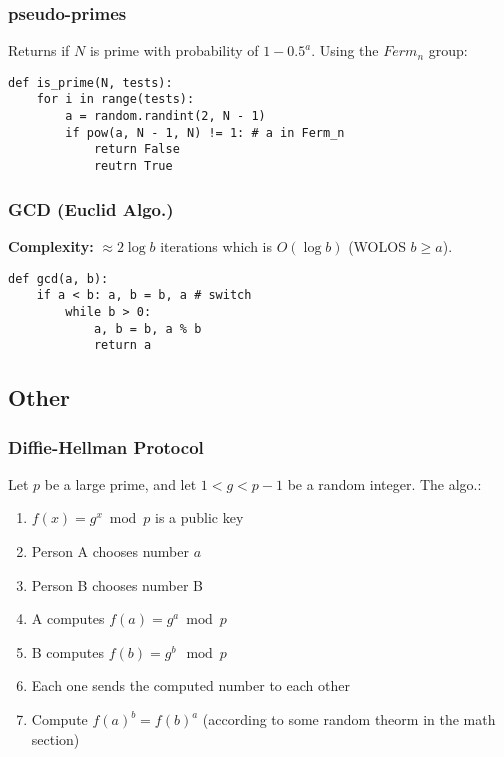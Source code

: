\documentclass[]{article}
\begin{document}
\begin{multicols}{2}
		\subsubsection{pseudo-primes}
		Returns if $ N $ is prime with probability of $ 1 - 0.5^{a} $. 
		Using the $ Ferm_n $ group: 
		\begin{lstlisting}
def is_prime(N, tests): 
	for i in range(tests): 
		a = random.randint(2, N - 1)
		if pow(a, N - 1, N) != 1: # a in Ferm_n
			return False
			reutrn True\end{lstlisting}
		\subsubsection{GCD (Euclid Algo.)}
		\textbf{Complexity: }$ \approx 2 \log b $ iterations which is $ O(\log b) $ (WOLOS $ b \ge a $). 
		\begin{lstlisting}
def gcd(a, b): 
	if a < b: a, b = b, a # switch
		while b > 0: 
			a, b = b, a % b
			return a\end{lstlisting}
		
		\subsection{Other}
		\subsubsection{Diffie-Hellman Protocol}
		Let $ p $ be a large prime, and let $ 1 < g < p - 1 $ be a random integer. The algo.: 
		\begin{enumerate}
			\item $ f(x) = g^x \bmod p $ is a public key
			\item Person A chooses number $ a $
			\item Person B chooses number B
			\item A computes $ f(a) = g^a \bmod p $
			\item B computes $ f(b) = g^b \mod p $
			\item Each one sends the computed number to each other
			\item Compute $ f(a)^b = f(b)^a $ (according to some random theorm in the math section) 
		\end{enumerate}
	\end{multicols}
	
	
\end{document}
